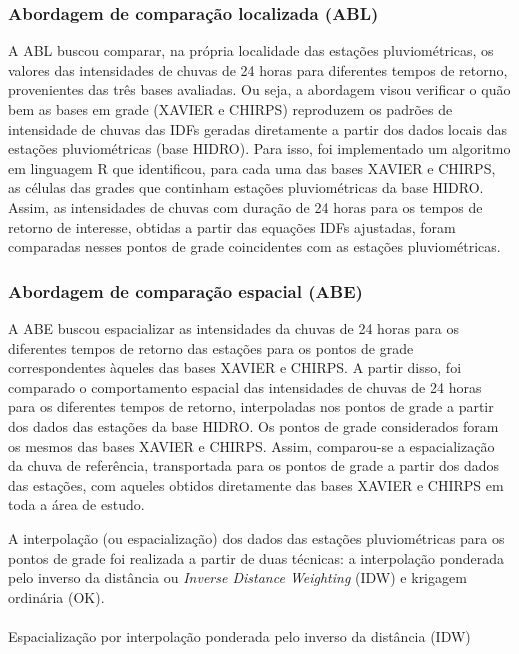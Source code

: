 \documentclass[
]{agujournal2019}
\makeatletter
\let\oldparagraph\paragraph
\renewcommand{\paragraph}{
    \@ifstar
      \xxxParagraphStar
      \xxxParagraphNoStar
  }
\newcommand{\xxxParagraphStar}[1]{\oldparagraph*{#1}\mbox{}}
\newcommand{\xxxParagraphNoStar}[1]{\oldparagraph{#1}\mbox{}}
\makeatother
\begin{document}
\subsubsection{Abordagem de comparação localizada
(ABL)}\label{abordagem-de-comparauxe7uxe3o-localizada-abl}

A ABL buscou comparar, na própria localidade das estações
pluviométricas, os valores das intensidades de chuvas de 24 horas para
diferentes tempos de retorno, provenientes das três bases avaliadas. Ou
seja, a abordagem visou verificar o quão bem as bases em grade (XAVIER e
CHIRPS) reproduzem os padrões de intensidade de chuvas das IDFs geradas
diretamente a partir dos dados locais das estações pluviométricas (base
HIDRO). Para isso, foi implementado um algoritmo em linguagem R que
identificou, para cada uma das bases XAVIER e CHIRPS, as células das
grades que continham estações pluviométricas da base HIDRO. Assim, as
intensidades de chuvas com duração de 24 horas para os tempos de retorno
de interesse, obtidas a partir das equações IDFs ajustadas, foram
comparadas nesses pontos de grade coincidentes com as estações
pluviométricas.

\subsubsection{Abordagem de comparação espacial
(ABE)}\label{abordagem-de-comparauxe7uxe3o-espacial-abe}

A ABE buscou espacializar as intensidades da chuvas de 24 horas para os
diferentes tempos de retorno das estações para os pontos de grade
correspondentes àqueles das bases XAVIER e CHIRPS. A partir disso, foi
comparado o comportamento espacial das intensidades de chuvas de 24
horas para os diferentes tempos de retorno, interpoladas nos pontos de
grade a partir dos dados das estações da base HIDRO. Os pontos de grade
considerados foram os mesmos das bases XAVIER e CHIRPS. Assim,
comparou-se a espacialização da chuva de referência, transportada para
os pontos de grade a partir dos dados das estações, com aqueles obtidos
diretamente das bases XAVIER e CHIRPS em toda a área de estudo.

A interpolação (ou espacialização) dos dados das estações pluviométricas
para os pontos de grade foi realizada a partir de duas técnicas: a
interpolação ponderada pelo inverso da distância ou \emph{Inverse
Distance Weighting} (IDW) e krigagem ordinária (OK).

\paragraph{Espacialização por interpolação ponderada pelo inverso da
distância
(IDW)}\label{espacializauxe7uxe3o-por-interpolauxe7uxe3o-ponderada-pelo-inverso-da-distuxe2ncia-idw}
\end{document}
